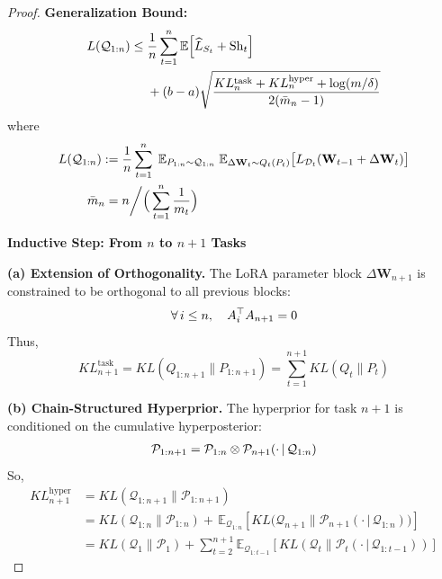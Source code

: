 \documentclass[letterpaper]{article} %
\begin{document}
\begin{proof}
\textbf{Generalization Bound:}
    \begin{align}
    L(\mathcal{Q}_{1:n}) \leq\; & \frac{1}{n} \sum_{t=1}^n 
        \mathbb{E} \Big[
            \widehat{L}_{S_t} + \mathrm{Sh}_t
        \Big] \notag \\
    & + (b-a) \sqrt{
        \frac{KL^{\text{task}}_n +KL^{\text{hyper}}_n + \log(m/\delta)}{2(\bar{m}_n - 1)}
    }
    \end{align}
    where
    \begin{align}
L(\mathcal{Q}_{1:n}) :=\; 
    &\frac{1}{n} \sum_{t=1}^n \;
      \mathbb{E}_{P_{1:n} \sim \mathcal{Q}_{1:n}} \;
      \mathbb{E}_{\Delta\mathbf{W}_t \sim Q_t(P_t)} 
      \big[
        L_{\mathcal{D}_t}(\mathbf{W}_{t-1} + \Delta\mathbf{W}_t)
      \big]  \notag \\
\bar{m}_n =\; 
    &n \bigg/ \Big( \sum_{t=1}^n \frac{1}{m_t} \Big) \notag
\end{align}


\textbf{Inductive Step: From $n$ to $n+1$ Tasks}


\textbf{(a) Extension of Orthogonality.}
The LoRA parameter block $\Delta\mathbf{W}_{n+1}$ is constrained to be orthogonal to all previous blocks:
    \begin{align}
        \forall\, i \leq n, \quad A_i^\top A_{n+1} = 0 \notag
    \end{align}
    Thus,
    \begin{equation}
        KL^{\text{task}}_{n+1}=KL(Q_{1:n+1} \| P_{1:n+1}) = \sum_{t=1}^{n+1} KL(Q_t \| P_t)
    \end{equation}

\textbf{(b) Chain-Structured Hyperprior.}
    The hyperprior for task $n+1$ is conditioned on the cumulative hyperposterior:
    \begin{align}
        \mathcal{P}_{1:n+1} = \mathcal{P}_{1:n} \otimes \mathcal{P}_{n+1}(\cdot\,|\,\mathcal{Q}_{1:n}) \notag
    \end{align}
    So,
    \begin{equation}
        \begin{aligned}
        KL^{\text{hyper}}_{n+1}
        &=KL(\mathcal{Q}_{1:n+1} \| \mathcal{P}_{1:n+1}) \\
        &= KL(\mathcal{Q}_{1:n} \| \mathcal{P}_{1:n}) +\, \mathbb{E}_{\mathcal{Q}_{1:n}}\left[ KL\big(\mathcal{Q}_{n+1} \| \mathcal{P}_{n+1}(\cdot\,|\,\mathcal{Q}_{1:n})\big) \right] 
        \\
        &= KL(\mathcal{Q}_1 \| \mathcal{P}_1) +
         \sum_{t=2}^{n+1} \mathbb{E}_{\mathcal{Q}_{1:t-1}}\left[ KL\left(\mathcal{Q}_t \| \mathcal{P}_t(\cdot\,|\,\mathcal{Q}_{1:t-1})\right) \right]
    \end{aligned}
    \end{equation}



\end{proof}
\end{document}
